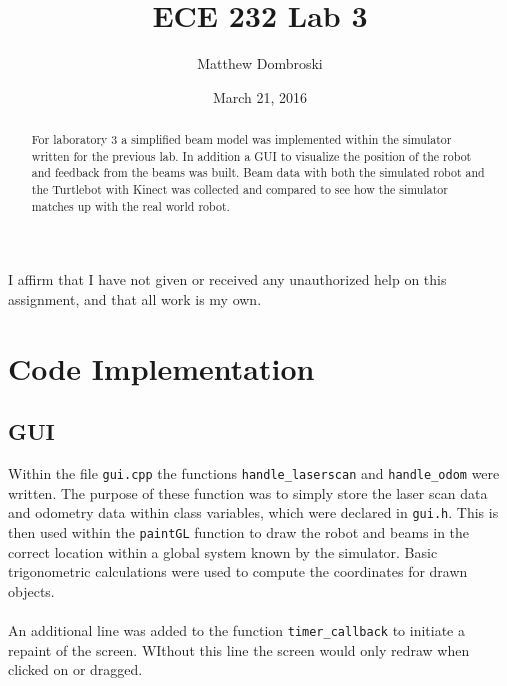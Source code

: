 \documentclass[letterpaper,12pt]{article}
\begin{document}
\title{ECE 232 Lab 3}
\author{Matthew Dombroski}
\date{March 21, 2016}
\maketitle


 I affirm that I have not given or received any unauthorized help on this assignment,
and that all work is my own.
\begin{abstract}
For laboratory 3 a simplified beam model was implemented within the simulator written for the previous lab. In addition a GUI to visualize the position of the robot and feedback from the beams was built. Beam data with both the simulated robot and the Turtlebot with Kinect was collected and compared to see how the simulator matches up with the real world robot. 
\end{abstract}


\section{Code Implementation}
\subsection{GUI}
Within the file \texttt{gui.cpp} the functions \texttt{handle\_laserscan} and \texttt{handle\_odom} were written. The purpose of these function was to simply store the laser scan data and odometry data within class variables, which were declared in \texttt{gui.h}. This is then used within the \texttt{paintGL} function to draw the robot and beams in the correct location within a global system known by the simulator. Basic trigonometric calculations were used to compute the coordinates for drawn objects. 
\\\\ 
An additional line was added to the function \texttt{timer\_callback} to initiate a repaint of the screen. WIthout this line the screen would only redraw when clicked on or dragged. 
\end{document}
